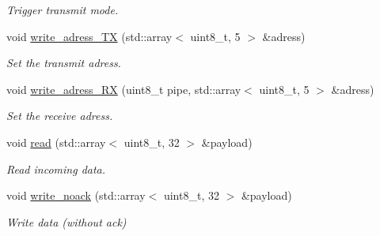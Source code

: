 \begin{DoxyCompactItemize}
\begin{DoxyCompactList}\small\item\em Trigger transmit mode. \end{DoxyCompactList}\item 
void \hyperlink{classNRF24_aa6bf7e16ef36684275d7e2ff0a8d4d98}{write\+\_\+adress\+\_\+\+TX} (std\+::array$<$ uint8\+\_\+t, 5 $>$ \&adress)
\begin{DoxyCompactList}\small\item\em Set the transmit adress. \end{DoxyCompactList}\item 
void \hyperlink{classNRF24_acd69b21875e0573a52ecaf707d1364b0}{write\+\_\+adress\+\_\+\+RX} (uint8\+\_\+t pipe, std\+::array$<$ uint8\+\_\+t, 5 $>$ \&adress)
\begin{DoxyCompactList}\small\item\em Set the receive adress. \end{DoxyCompactList}\item 
void \hyperlink{classNRF24_a30b979af4d98047b48b2895c6eeb2116}{read} (std\+::array$<$ uint8\+\_\+t, 32 $>$ \&payload)
\begin{DoxyCompactList}\small\item\em Read incoming data. \end{DoxyCompactList}\item 
void \hyperlink{classNRF24_a83fa4502e17465aaf55fc65c80d30f8c}{write\+\_\+noack} (std\+::array$<$ uint8\+\_\+t, 32 $>$ \&payload)
\begin{DoxyCompactList}\small\item\em Write data (without ack) \end{DoxyCompactList}\end{DoxyCompactItemize}
